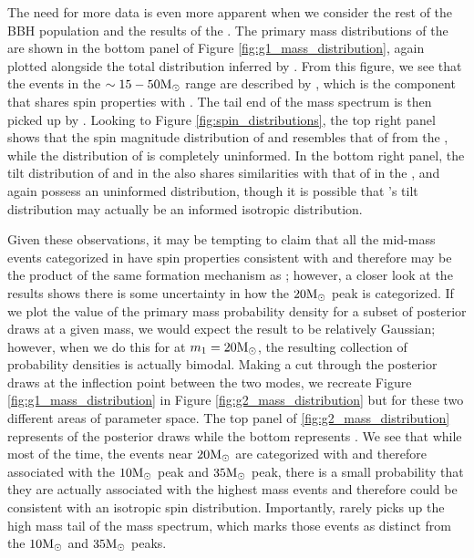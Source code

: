 The need for more data is even more apparent when we consider the rest of the BBH population and the results of the \comp{}. The primary mass distributions of the \comp{} are shown in the bottom panel of Figure \ref{fig:g1_mass_distribution}, again plotted alongside the total distribution inferred by \brucepaper{}. From this figure, we see that the events in the $\sim15-50 {\rm M}_\odot$ range are described by \contA{}, which is the component that shares spin properties with \first{}. The tail end of the mass spectrum is then picked up by \contB{}. Looking to Figure \ref{fig:spin_distributions}, the top right panel shows that the spin magnitude distribution of \first{} and \contA{} resembles that of \first{} from the \base{}, while the distribution of \contB{} is completely uninformed. In the bottom right panel, the tilt distribution of \first{} and \contA{} in the \comp{} also shares similarities with that of \first{} in the \base{}, and again \contB{} possess an uninformed distribution, though it is possible that \contB{}'s tilt distribution may actually be an informed isotropic distribution.

Given these observations, it may be tempting to claim that all the mid-mass events categorized in \contA{} have spin properties consistent with \first{} and therefore may be the product of the same formation mechanism as \first{}; however, a closer look at the results shows there is some uncertainty in how the $20 {\rm M}_\odot$ peak is categorized. If we plot the value of the primary mass probability density for a subset of posterior draws at a given mass, we would expect the result to be relatively Gaussian; however, when we do this for \contB{} at $m_1 = 20 {\rm M}_\odot$, the resulting collection of probability densities is actually bimodal. Making a cut through the posterior draws at the inflection point between the two modes, we recreate Figure \ref{fig:g1_mass_distribution} in Figure \ref{fig:g2_mass_distribution} but for these two different areas of parameter space. The top panel of \ref{fig:g2_mass_distribution} represents  of the posterior draws while the bottom represents . We see that while most of the time, the events near $20{\rm M}_\odot$ are categorized with \contA{} and therefore associated with the $10{\rm M}_\odot$ peak and $35{\rm M}_\odot$ peak, there is a small probability that they are actually associated with the highest mass events and therefore could be consistent with an isotropic spin distribution. Importantly, \contA{} rarely picks up the high mass tail of the mass spectrum, which marks those events as distinct from the $10{\rm M}_\odot$ and $35{\rm M}_\odot$ peaks. 

